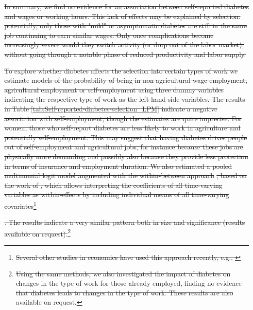 \documentclass[12pt,english]{article}
\providecommand{\DIFdeltex}[1]{{\protect\color{red}\sout{#1}}}                      %
\providecommand{\DIFdel}[1]{\texorpdfstring{\DIFdeltex{#1}}{}} %
\begin{document}
\DIFdel{In summary, we find no evidence for an association between self-reported diabetes and wages or working hours. This lack of effects may be explained by selection: potentially, only those with "mild" or asymptomatic diabetes are still in the same job continuing to earn similar wages. Only once complications become increasingly severe would they switch activity (or drop out of the labor market), without going through a notable phase of reduced productivity and labor supply.
}%

\DIFdel{To explore whether diabetes affects the selection into certain types of work we estimate }%
\DIFdel{models of the probability of being in non-agricultural wage employment, agricultural employment or self-employment using three dummy variables indicating the respective type of work as the left hand side variables. The results in Table \ref{tab:Self-reported-diabetes-selection_LPM} indicate a negative association with self-employment, though the estimates are quite imprecise. For women, those who self-report diabetes are less likely to work in agriculture and potentially self-employment. This may suggest that having diabetes drives people out of self-employment and agricultural jobs, for instance because these jobs are physically more demanding and possibly also because they provide less protection in terms of insurance and employment duration. We also estimated a pooled multinomial logit model augmented  with the within-between approach }%
\DIFdel{, based on the work of \textcite{Mundlak1978}, which allows interpreting the coefficients of all time-varying variables as within-effects by including individual means of all time-varying covariates}\footnote{\DIFdel{Several other studies in economics have used this approach recently, e.g., \textcite{Geishecker2011,Wunder2014,Boll2016}}}%
\addtocounter{footnote}{-1}%
\DIFdel{. The results indicate a very similar pattern both in size and significance (results available on request).}\footnote{\DIFdel{Using the same methods, we also investigated the impact of diabetes on changes in the type of work for those already employed, finding no evidence that diabetes leads to changes in the type of work. These results are also available on request.}}
\addtocounter{footnote}{-1}%
\end{document}
